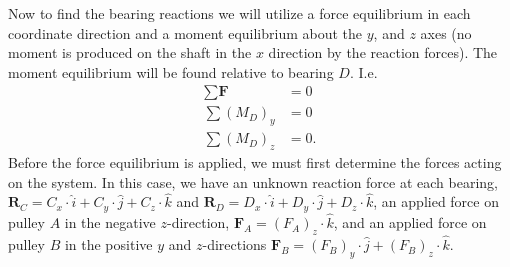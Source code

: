 \documentclass[a4paper]{article}
\theoremstyle{definition}
\begin{document}
Now to find the bearing reactions we will utilize a force equilibrium in each coordinate direction and a moment equilibrium about the $y$, and $z$ axes (no moment is produced on the shaft in the $x$ direction by the reaction forces). The moment equilibrium will be found relative to bearing $D$. I.e.
\begin{align*}
  \sum \textbf{F} &= 0 \\
  \sum \left( M_D \right)_y &= 0 \\
  \sum \left( M_D \right)_z &= 0
.\end{align*}
Before the force equilibrium is applied, we must first determine the forces acting on the system. In this case, we have an unknown reaction force at each bearing, $\textbf{R}_C = C_x \cdot \hat{i} + C_y \cdot \hat{j} + C_z \cdot \hat{k}$ and $\textbf{R}_D = D_x \cdot \hat{i} + D_y \cdot \hat{j} + D_z \cdot \hat{k}$, an applied force on pulley $A$ in the negative $z$-direction, $\textbf{F}_A = \left( F_A \right)_z \cdot \hat{k}$, and an applied force on pulley $B$ in the positive $y$ and $z$-directions $\textbf{F}_B = \left( F_B \right)_y \cdot \hat{j} + \left( F_B \right)_z \cdot \hat{k}$. 
\end{document}
